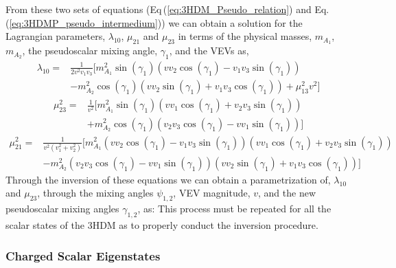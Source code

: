 \documentclass[10pt]{report}
\begin{document}
From these two sets of equations (Eq\,(\ref{eq:3HDM_Pseudo_relation}) and Eq.\,(\ref{eq:3HDMP_pseudo_intermedium})) we can obtain a solution for the Lagrangian parameters, $\lambda_{10}$, $\mu_{21}$ and $\mu_{23}$ in terms of the physical masses, $m_{A_1}$, $m_{A_2}$, the pseudoscalar mixing angle, $\gamma_1$, and the VEVs as,  
\begin{equation}
\begin{split}
\lambda_{10} = & \frac{1}{2 v^2 v_1 v_3} \Bigg[ m_{A_1}^2 \sin \left(\gamma _1\right) \left(v v_2 \cos \left(\gamma _1\right)- v_1 v_3 \sin \left(\gamma _1\right)\right) \\ & -m_{A_2}^2 \cos \left(\gamma _1\right) \left(v v_2 \sin \left(\gamma _1\right)+v_1 v_3 \cos \left(\gamma _1\right)\right)+\mu_{13}^2 v^2 \Bigg] 
\end{split} 
\end{equation}
\begin{equation}
\begin{split}
\mu_{23}^2 = & \frac{1}{v^2} \Bigg[ m_{A_1}^2 \sin \left(\gamma _1\right) \left(v v_1 \cos \left(\gamma _1\right)+v_2 v_3 \sin \left(\gamma _1\right)\right) \\ & +m_{A_2}^2 \cos \left(\gamma _1\right) \left(v_2 v_3 \cos \left(\gamma _1\right)-v v_1 \sin \left(\gamma _1\right)\right) \Bigg] 
\end{split} 
\end{equation}
\begin{equation}
\begin{split} 
\mu_{21}^2 = & \frac{1}{v^2 \left(v_1^2+v_2^2\right)} \Bigg [ m_{A_1}^2 \left(v v_2 \cos \left(\gamma _1\right)-v_1 v_3 \sin \left(\gamma _1\right)\right) \left(v v_1 \cos \left(\gamma _1\right)+v_2 v_3 \sin \left(\gamma _1\right)\right) \\ & - m_{A_2}^2 \left(v_2 v_3 \cos \left(\gamma _1\right)-v v_1 \sin \left(\gamma _1\right)\right) \left(v v_2 \sin \left(\gamma _1\right)+v_1 v_3 \cos \left(\gamma _1\right)\right) \Bigg] 
\end{split} 
\end{equation}
%
Through the inversion of these equations we can obtain a parametrization of, $\lambda_{10}$ and $\mu_{23}$, through the mixing angles $\psi_{1,2}$, VEV magnitude, $v$, and the new pseudoscalar mixing angles $\gamma_{1,2}$, as:
%
This process must be repeated for all the scalar states of the 3HDM as to properly conduct the inversion procedure. 

\subsubsection{Charged Scalar Eigenstates}
\end{document}
